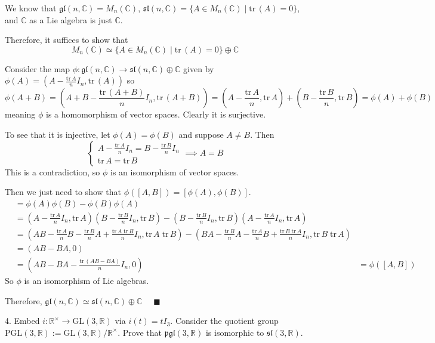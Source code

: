 \documentclass[12pt]{article}
\newcommand{\C}{\mathbb{C}}
\newcommand{\R}{\mathbb{R}}
\newcommand{\GL}{\text{GL}}
\newcommand{\PGL}{\text{PGL}}
\newcommand{\lra}{\longrightarrow}
\newcommand{\gl}{\mathfrak{gl}}
\newcommand{\sll}{\mathfrak{sl}}
\newcommand{\pgl}{\mathfrak{pgl}}
\newcommand{\qed}{\quad \blacksquare}
\newcommand{\tr}{\text{tr}\,}
\begin{document}
        We know that $\gl(n, \C) = M_n(\C)$, $\sll(n, \C) = \{A \in M_n(\C) \; | \; \tr(A) = 0\}$, and $\C$ as a Lie algebra is just $\C$.

        Therefore, it suffices to show that 
        \[M_n(\C) \simeq \{A \in M_n(\C) \; | \; \tr(A) = 0\} \oplus \C\]

        Consider the map $\phi: \gl(n, \C) \to \sll(n, \C) \oplus \C$ given by $\phi(A) = (A - \frac{\tr A}{n} I_n, \tr(A))$ so 
        \[\phi(A + B) = (A + B - \frac{\tr(A + B)}{n}I_n, \tr(A + B)) = (A - \frac{\tr A}{n}, \tr A) + (B - \frac{\tr B}{n}, \tr B) = \phi(A) + \phi(B)\] 
        meaning $\phi$ is a homomorphism of vector spaces. Clearly it is surjective. 

        To see that it is injective, let $\phi(A) = \phi(B)$ and suppose $A \neq B$. Then
        \[\begin{cases}
            A - \frac{\tr A}{n}I_n = B - \frac{\tr B}{n}I_n\\
            \tr A = \tr B
        \end{cases} \implies A = B\]
        This is a contradiction, so $\phi$ is an isomorphism of vector spaces. 

        Then we just need to show that $\phi([A, B]) = [\phi(A), \phi(B)]$. 
        \begin{align*}
            [\phi(A), \phi(B)] &=  \phi(A)\phi(B) - \phi(B)\phi(A)\\
                &= \left(A - \frac{\tr A}{n}I_n, \tr A\right)\left(B - \frac{\tr B}{n}I_n, \tr B\right) - \left(B - \frac{\tr B}{n}I_n, \tr B\right)\left(A - \frac{\tr A}{n}I_n, \tr A\right)\\
                &= \left(AB - \frac{\tr A}{n}B - \frac{\tr B}{n}A + \frac{\tr A\; \tr B}{n}I_n, \tr A\; \tr B\right) - \left(BA - \frac{\tr B}{n}A - \frac{\tr A}{n}B + \frac{\tr B\; \tr A}{n}I_n, \tr B \; \tr A\right)\\
                &= \left(AB - BA, 0\right)\\ 
                &= \left(AB - BA - \frac{\tr(AB - BA)}{n} I_n, 0\right)
                &= \phi([A, B])
        \end{align*}
        So $\phi$ is an isomorphism of Lie algebras. 

        Therefore, $\gl(n,\C) \simeq \sll(n,\C)\oplus \C$ $\qed$

    \color{black}
        

\pagebreak

4.  Embed $i: \R^{\times} \lra \GL(3,\R)$ via $i(t) = tI_{3}$.  Consider the quotient group $\PGL(3,\R) := \GL(3,\R)/\R^{\times}$.  Prove that $\pgl(3,\R)$ is isomorphic to $\sll(3,\R)$.  
\end{document}
